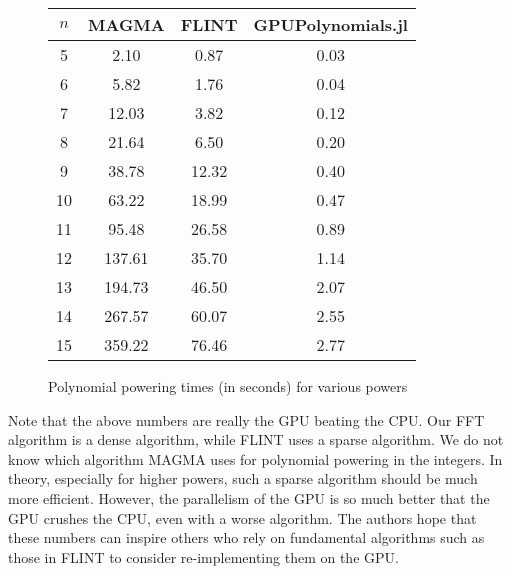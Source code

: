 \begin{figure}[h]
\begin{center}
\begin{tabular}{|c|c|c|c|}
    \hline
    \(n\) & MAGMA & FLINT & GPUPolynomials.jl \\
    \hline
    5 & 2.10 &    0.87 &  0.03 \\
    \hline
    6 & 5.82 &    1.76 &  0.04 \\
    \hline
    7 & 12.03 &   3.82 &  0.12 \\
    \hline
    8 & 21.64 &   6.50 &  0.20 \\
    \hline
    9 & 38.78 &   12.32 & 0.40 \\
    \hline
    10 & 63.22 &  18.99 & 0.47 \\
    \hline
    11 & 95.48 &  26.58 & 0.89 \\
    \hline
    12 & 137.61 & 35.70 & 1.14 \\
    \hline
    13 & 194.73 & 46.50 & 2.07 \\
    \hline
    14 & 267.57 & 60.07 & 2.55 \\
    \hline
    15 & 359.22 & 76.46 & 2.77 \\
    \hline
\end{tabular}
\caption{Polynomial powering times (in seconds) for various powers}
\end{center}
\end{figure}

Note that the above numbers are really the GPU beating the CPU.
Our FFT algorithm is a dense algorithm, while FLINT uses a sparse algorithm.
We do not know which algorithm MAGMA uses for polynomial powering
in the integers.
In theory, especially for higher powers, such a sparse algorithm should
be much more efficient. 
However, the parallelism of the GPU is so much better that the
GPU crushes the CPU, even with a worse algorithm.
The authors hope that these numbers can inspire others who
rely on fundamental algorithms such as those in FLINT to 
consider re-implementing them on the GPU.


